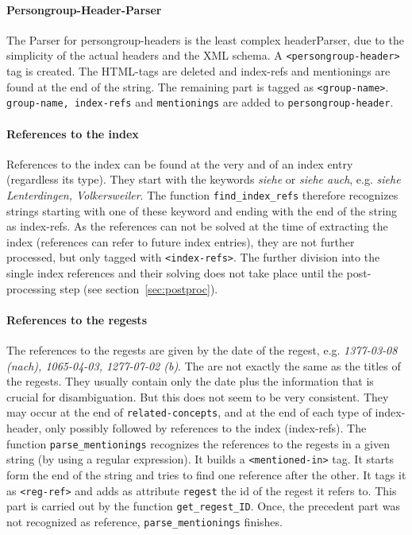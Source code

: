 \paragraph{Persongroup-Header-Parser}
The Parser for persongroup-headers is the least complex headerParser, due to the simplicity of the actual headers and the XML schema. A \texttt{<persongroup-header>} tag is created. The HTML-tags are deleted and index-refs and mentionings are found at the end of the string. The remaining part is tagged as \texttt{<group-name>}. \texttt{group-name, index-refs} and \texttt{mentionings} are added to \texttt{persongroup-header}.

\paragraph{References to the index}
\label{sec:index-refs}
References to the index can be found at the very and of an index entry (regardless its type). They start with the keywords \textit{siehe} or \textit{siehe auch}, e.g. \textit{siehe Lenterdingen, Volkersweiler}. The function \texttt{find\_index\_refs} therefore recognizes strings starting with one of these keyword and ending with the end of the string as index-refs. As the references can not be solved at the time of extracting the index (references can refer to future index entries), they are not further processed, but only tagged with \texttt{<index-refs>}. The further division into the single index references and their solving does not take place until the post-processing step (see section~\ref{sec:postproc}).

\paragraph{References to the regests}
\label{sec:reg-refs}
The references to the regests are given by the date of the regest, e.g. \textit{1377-03-08 (nach), 1065-04-03, 1277-07-02 (b)}. The are not exactly the same as the titles of the regests. They usually contain only the date plus the information that is crucial for disambiguation. But this does not seem to be very consistent. They may occur at the end of \texttt{related-concepts}, and at the end of each type of index-header, only possibly followed by references to the index (index-refs).
The function \texttt{parse\_mentionings} recognizes the references to the regests in a given string (by using a regular expression). It builds a \texttt{<mentioned-in>} tag. It starts form the end of the string and tries to find one reference after the other. It tags it as \texttt{<reg-ref>} and adds as attribute \texttt{regest} the id of the regest it refers to. This part is carried out by the function \texttt{get\_regest\_ID}. Once, the precedent part was not recognized as reference, \texttt{parse\_mentionings} finishes.


